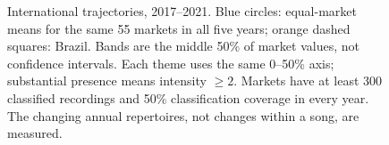 \begin{figure}[t]
\caption{International trajectories, 2017--2021. Blue circles: equal-market means for the same 55 markets in all five years; orange dashed squares: Brazil. Bands are the middle 50\% of market values, not confidence intervals. Each theme uses the same 0--50\% axis; substantial presence means intensity $\geq2$. Markets have at least 300 classified recordings and 50\% classification coverage in every year. The changing annual repertoires, not changes within a song, are measured.}
\label{fig:global-time}
\end{figure}

